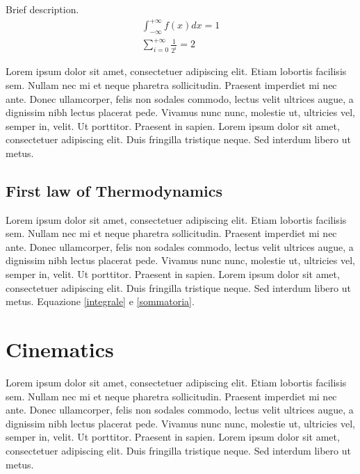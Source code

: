 \documentclass{book}
\begin{document}
\vspace*{0.2cm}
\begin{tcolorbox}[colback = yellow!30, colframe = yellow!30!black, title = {Some equations}]
Brief description.
  \begin{align}
  \int_{-\infty}^{+\infty}f(x)dx = 1\label{integrale}\\
  \sum_{i = 0}^{+\infty} \frac{1}{2^i} = 2\label{sommatoria}
\end{align}

\end{tcolorbox}

Lorem ipsum dolor sit amet, consectetuer adipiscing elit. Etiam lobortis facilisis
sem. Nullam nec mi et neque pharetra sollicitudin. Praesent imperdiet mi nec
ante. Donec ullamcorper, felis non sodales commodo, lectus velit ultrices augue,
a dignissim nibh lectus placerat pede. Vivamus nunc nunc, molestie ut, ultricies
vel, semper in, velit. Ut porttitor. Praesent in sapien. Lorem ipsum dolor sit
amet, consectetuer adipiscing elit. Duis fringilla tristique neque. Sed interdum
libero ut metus. 

\subsection{First law of Thermodynamics}
Lorem ipsum dolor sit amet, consectetuer adipiscing elit. Etiam lobortis facilisis
sem. Nullam nec mi et neque pharetra sollicitudin. Praesent imperdiet mi nec
ante. Donec ullamcorper, felis non sodales commodo, lectus velit ultrices augue,
a dignissim nibh lectus placerat pede. Vivamus nunc nunc, molestie ut, ultricies
vel, semper in, velit. Ut porttitor. Praesent in sapien. Lorem ipsum dolor sit
amet, consectetuer adipiscing elit. Duis fringilla tristique neque. Sed interdum
libero ut metus. Equazione \ref{integrale} e \ref{sommatoria}.

\section{Cinematics}
Lorem ipsum dolor sit amet, consectetuer adipiscing elit. Etiam lobortis facilisis
sem. Nullam nec mi et neque pharetra sollicitudin. Praesent imperdiet mi nec
ante. Donec ullamcorper, felis non sodales commodo, lectus velit ultrices augue,
a dignissim nibh lectus placerat pede. Vivamus nunc nunc, molestie ut, ultricies
vel, semper in, velit. Ut porttitor. Praesent in sapien. Lorem ipsum dolor sit
amet, consectetuer adipiscing elit. Duis fringilla tristique neque. Sed interdum
libero ut metus. 
\end{document}
